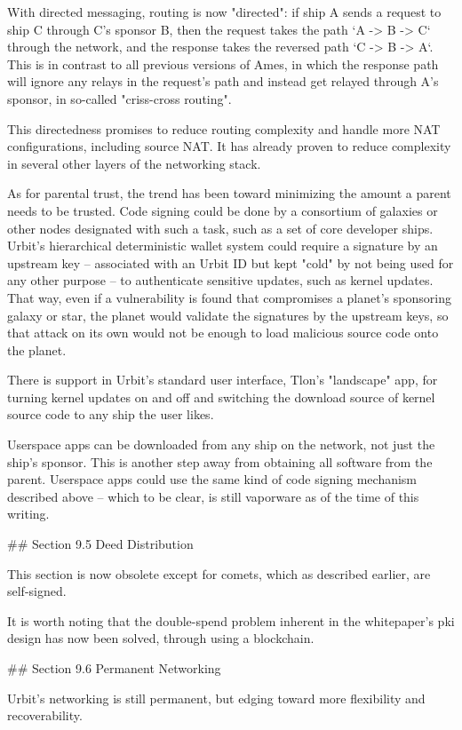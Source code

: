 \documentclass[twoside]{article}
\begin{document}
With directed messaging, routing is now "directed": if ship A sends a request to ship C through C's sponsor B, then the request takes the path `A -> B -> C` through the network, and the response takes the reversed path `C -> B -> A`.  This is in contrast to all previous versions of Ames, in which the response path will ignore any relays in the request's path and instead get relayed through A's sponsor, in so-called "criss-cross routing".

This directedness promises to reduce routing complexity and handle more NAT configurations, including source NAT.  It has already proven to reduce complexity in several other layers of the networking stack.

As for parental trust, the trend has been toward minimizing the amount a parent needs to be trusted.  Code signing could be done by a consortium of galaxies or other nodes designated with such a task, such as a set of core developer ships.  Urbit's hierarchical deterministic wallet system could require a signature by an upstream key – associated with an Urbit ID but kept "cold" by not being used for any other purpose – to authenticate sensitive updates, such as kernel updates.  That way, even if a vulnerability is found that compromises a planet's sponsoring galaxy or star, the planet would validate the signatures by the upstream keys, so that attack on its own would not be enough to load malicious source code onto the planet.

There is support in Urbit's standard user interface, Tlon's "landscape" app, for turning kernel updates on and off and switching the download source of kernel source code to any ship the user likes.

Userspace apps can be downloaded from any ship on the network, not just the ship's sponsor.  This is another step away from obtaining all software from the parent.  Userspace apps could use the same kind of code signing mechanism described above – which to be clear, is still vaporware as of the time of this writing.

## Section 9.5 Deed Distribution

This section is now obsolete except for comets, which as described earlier, are self-signed.

It is worth noting that the double-spend problem inherent in the whitepaper's {\sc pki} design has now been solved, through using a blockchain.

## Section 9.6 Permanent Networking

Urbit's networking is still permanent, but edging toward more flexibility and recoverability.  
\end{document}
